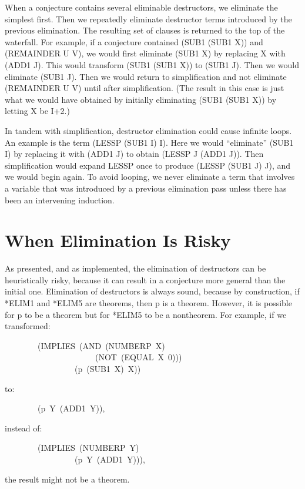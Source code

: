 \documentclass[10pt]{book}
\newenvironment{pubasis}{\begin{flushleft}}{\end{flushleft}}
\begin{document}
When a conjecture contains several eliminable destructors, we eliminate
the simplest first.  Then we repeatedly eliminate destructor
terms introduced by the previous elimination.  The resulting
set of clauses is returned to the top of the waterfall.
For example, if a conjecture contained (SUB1 (SUB1 X)) and
(REMAINDER U V), we would first eliminate
(SUB1 X) by replacing X with (ADD1 J).  This would transform (SUB1 (SUB1 X))
to (SUB1 J).  Then we would eliminate (SUB1 J).
Then we would return to simplification and not eliminate
(REMAINDER U V) until after simplification.
(The result in this case is just
what we would have obtained by initially eliminating (SUB1 (SUB1 X)) by
letting X be I+2.)

In tandem
with simplification, destructor elimination could cause infinite loops.
An example is the term (LESSP (SUB1 I) I).  Here we
would ``eliminate'' (SUB1 I) by replacing it with (ADD1 J) to obtain
(LESSP J (ADD1 J)).  Then simplification would expand LESSP once to
produce (LESSP (SUB1 J) J), and we would begin again. To avoid looping,
we
never eliminate a term that involves a
variable that was introduced by a previous elimination pass
unless there has been an intervening induction.

\section{When Elimination Is Risky}
\label{SSECWHENELIMINATIONISRISKY}
As presented, and as implemented, the elimination of destructors
can be heuristically risky, because it
can result in a conjecture more general than the initial one.
Elimination of destructors is always sound, because
by construction, if *ELIM1 and *ELIM5 are theorems, then p is a theorem.
However, it is possible for p to be a theorem but for *ELIM5
to be a nontheorem.  For example, if we
transformed:

\begin{pubasis}
~~~~~~~~(IMPLIES~(AND~(NUMBERP~X)\\
~~~~~~~~~~~~~~~~~~~~~~(NOT~(EQUAL~X~0)))\\
~~~~~~~~~~~~~~~~~(p~(SUB1~X)~X))\\
\end{pubasis}
to:
\begin{pubasis}
~~~~~~~~(p~Y~(ADD1~Y)),\\
\end{pubasis}
instead of:
\begin{pubasis}
~~~~~~~~(IMPLIES~(NUMBERP~Y)\\
~~~~~~~~~~~~~~~~~(p~Y~(ADD1~Y))),\\
\end{pubasis}
the result might not be a theorem.
\end{document}
